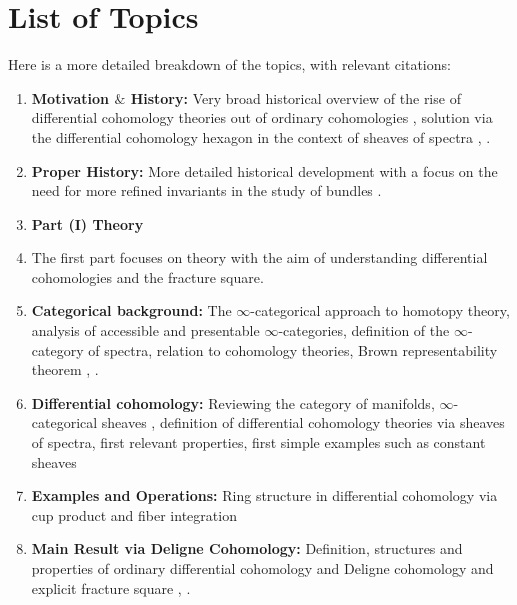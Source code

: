 \documentclass[10pt]{amsart}
\begin{document}
\section{List of Topics}
Here is a more detailed breakdown of the topics, with relevant citations:
\begin{enumerate}[itemsep=0.3cm]
	\item \textbf{Motivation $\&$ History:} Very broad historical overview of the rise of differential cohomology theories out of ordinary cohomologies \cite{hopkinssinger2005differentialcoh,simonssullivan2008diffcoh,stimpson2011diffcoh}, solution via the differential cohomology hexagon in the context of sheaves of spectra \cite[Section 2]{adh2021differentialcohomology}, \cite{debray2023diffcoh}.
	\item \textbf{Proper History:} More detailed historical development with a focus on the need for more refined invariants in the study of bundles \cite{hopkinssinger2005differentialcoh,simonssullivan2008diffcoh,stimpson2011diffcoh}.
	\item[] \textbf{\large Part (I) Theory}
	\item[] The first part focuses on theory with the aim of understanding differential cohomologies and the fracture square. 
	\item \textbf{Categorical background:} The $\infty$-categorical approach to homotopy theory, analysis of accessible and presentable $\infty$-categories, definition of the $\infty$-category of spectra, relation to cohomology theories, Brown representability theorem \cite[Section 1]{lurie2017ha}, \cite{groth2010inftycats}.
	\item \textbf{Differential cohomology:} Reviewing the category of manifolds, $\infty$-categorical sheaves \cite[Section 6]{lurie2009htt}, definition of differential cohomology theories via sheaves	of spectra, first relevant properties, first simple examples such as constant sheaves \cite[Section 2]{adh2021differentialcohomology}
	\item \textbf{Examples and Operations:} Ring structure in differential cohomology via cup product \cite[Section 8]{adh2021differentialcohomology} and fiber integration \cite[Section 9]{adh2021differentialcohomology}
	\item \textbf{Main Result via Deligne Cohomology:} Definition, structures and properties of ordinary differential cohomology and Deligne cohomology and explicit fracture square \cite[Sections 6, 7]{adh2021differentialcohomology}, \cite{bunkenikolausvoelkl2016differentialcohomology}.

\end{enumerate}
\end{document}
